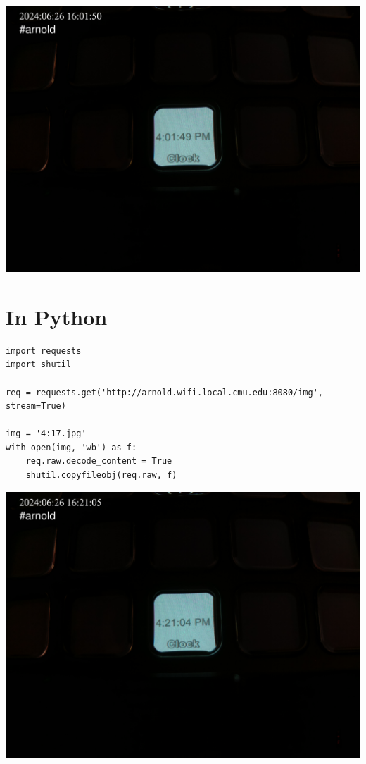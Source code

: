 \documentclass[11pt]{article}
\begin{document}
\begin{center}
\includegraphics[width=.9\linewidth]{./4.01.jpg}
\end{center}
\section{In Python}
\label{sec:orgda5d379}

\begin{verbatim}
import requests
import shutil

req = requests.get('http://arnold.wifi.local.cmu.edu:8080/img', stream=True)

img = '4:17.jpg'
with open(img, 'wb') as f:
    req.raw.decode_content = True
    shutil.copyfileobj(req.raw, f)
\end{verbatim}

\begin{center}
\includegraphics[width=.9\linewidth]{./4:17.jpg}
\end{center}
\end{document}
